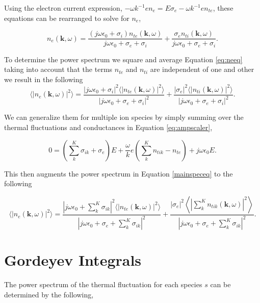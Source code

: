 Using the electron current expression, $-\omega k^{-1}en_e = E\sigma_e -\omega k^{-1}en_{te}$, these equations can be rearranged to solve for $n_e$, 

\begin{equation}
\label{eq:neeq}
n_e(\mathbf{k},\omega) =  \frac{(j\omega\epsilon_0 + \sigma_i) n_{te}(\mathbf{k},\omega)}{j\omega\epsilon_0 +\sigma_e+\sigma_i} + \frac{\sigma_en_{ti}(\mathbf{k},\omega)}{j\omega\epsilon_0 +\sigma_e+\sigma_i}.
\end{equation}

\noindent To determine the power spectrum we square and average Equation \ref{eq:neeq} taking into account that the terms $n_{te}$ and $n_{ti}$ are independent of one and other we result in the following
\begin{equation}
\label{mainspeceq}
\langle \left|n_e(\mathbf{k},\omega)\right|^2\rangle = \frac{|j\omega\epsilon_0 + \sigma_i|^2 \langle |n_{te}(\mathbf{k},\omega)|^2\rangle}{|j\omega\epsilon_0 +\sigma_e+\sigma_i|^2} + \frac{| \sigma_e|^2 \langle |n_{ti}(\mathbf{k},\omega)|^2\rangle}{|j\omega\epsilon_0 +\sigma_e+\sigma_i|^2}.
\end{equation}

We can generalize them for multiple ion species by simply summing over the thermal fluctuations and conductances in Equation \ref{eq:ampscaler},

\begin{equation} 
\label{eq:ampscalersum}
0=\left(\displaystyle \sum_k^K\sigma_{ik} +\sigma_e\right)E +\frac{\omega}{k}e\left(\sum_k^Kn_{tik}-n_{te}\right) +j\omega \epsilon_0 E.
\end{equation}

\noindent This then augments the power spectrum in Equation \ref{mainspeceq} to the following

\begin{equation}
\label{eq:sumspeceq}
\displaystyle \langle \left|n_e(\mathbf{k},\omega)\right|^2\rangle = \frac{\left|j\omega\epsilon_0 +  \sum_k^K\sigma_{ik} \right|^2 \langle |n_{te}(\mathbf{k},\omega)|^2\rangle}{\left|j\omega\epsilon_0 +\sigma_e+ \sum_k^K\sigma_{ik} \right|^2} + \frac{| \sigma_e|^2 \left \langle \left|\sum_k^Kn_{tik}(\mathbf{k},\omega)\right|^2\right\rangle}{\left|j\omega\epsilon_0 +\sigma_e+ \sum_k^K\sigma_{ik} \right|^2}.
\end{equation}

\section{Gordeyev Integrals}
The power spectrum of the thermal fluctuation for each species $s$ can be determined by the following,


